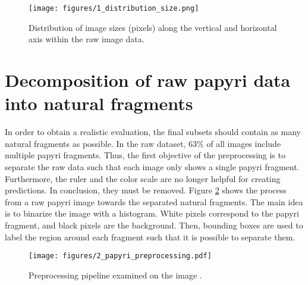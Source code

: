 \begin{figure}[t]
	\texttt{[image: figures/1\_distribution\_size.png]}
	\caption{Distribution of image sizes (pixels) along the vertical and horizontal axis within the raw image data.}
	\label{fig:distribution_image_size}
\end{figure}

\section{Decomposition of raw papyri data into natural fragments}
\label{sec:deseperation}
In order to obtain a realistic evaluation, the final subsets should contain as many natural fragments as possible. In the raw dataset, 63\% of all images include multiple papyri fragments. Thus, the first objective of the preprocessing is to separate the raw data such that each image only shows a single papyri fragment. Furthermore, the ruler and the color scale are no longer helpful for creating predictions. In conclusion, they must be removed. Figure \ref{fig:papyri_preprocessing} shows the process from a raw papyri image towards the separated natural fragments. The main idea is to binarize the image with a histogram. White pixels correspond to the papyri fragment, and black pixels are the background. Then, bounding boxes are used to label the region around each fragment such that it is possible to separate them.\\

\begin{figure}[t]
	\texttt{[image: figures/2\_papyri\_preprocessing.pdf]}
	\caption{Preprocessing pipeline examined on the image .}
	\label{fig:papyri_preprocessing}
\end{figure}

